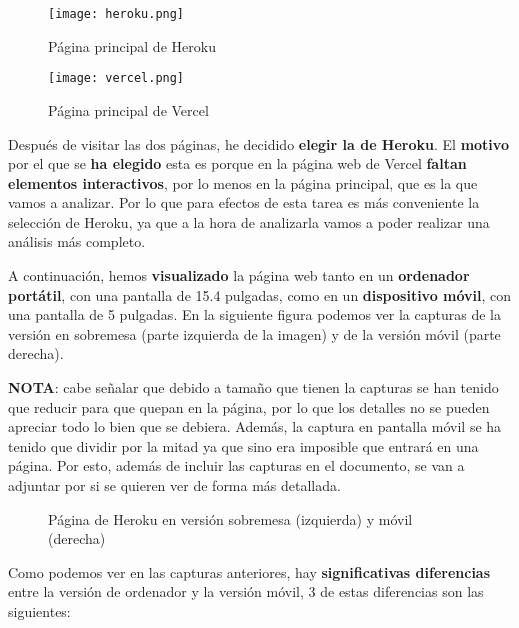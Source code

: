 \begin{figure}[H]
    \centering
    \texttt{[image: heroku.png]}
    \caption{Página principal de Heroku}
\end{figure}

\begin{figure}[H]
    \centering
    \texttt{[image: vercel.png]}
    \caption{Página principal de Vercel}
\end{figure}

Después de visitar las dos páginas, he decidido \textbf{elegir la de Heroku}. El \textbf{motivo} por el que se \textbf{ha elegido} esta es porque en la página web de Vercel \textbf{faltan elementos interactivos}, por lo menos en la página principal, que es la que vamos a analizar. Por lo que para efectos de esta tarea es más conveniente la selección de Heroku, ya que a la hora de analizarla vamos a poder realizar una análisis más completo.

A continuación, hemos \textbf{visualizado} la página web tanto en un \textbf{ordenador portátil}, con una pantalla de 15.4 pulgadas, como en un \textbf{dispositivo móvil}, con una pantalla de 5 pulgadas. En la siguiente figura podemos ver la capturas de la versión en sobremesa (parte izquierda de la imagen) y de la versión móvil (parte derecha).

\textbf{NOTA}: cabe señalar que debido a tamaño que tienen la capturas se han tenido que reducir para que quepan en la página, por lo que los detalles no se pueden apreciar todo lo bien que se debiera. Además, la captura en pantalla móvil se ha tenido que dividir por la mitad ya que sino era imposible que entrará en una página. Por esto, además de incluir las capturas en el documento, se van a adjuntar por si se quieren ver de forma más detallada.

\begin{figure}[H]
    \centering
    \hspace{1cm}
        
    \caption{Página de Heroku en versión sobremesa (izquierda) y móvil (derecha)}
\end{figure}

Como podemos ver en las capturas anteriores, hay \textbf{significativas diferencias} entre la versión de ordenador y la versión móvil, 3 de estas diferencias son las siguientes:

